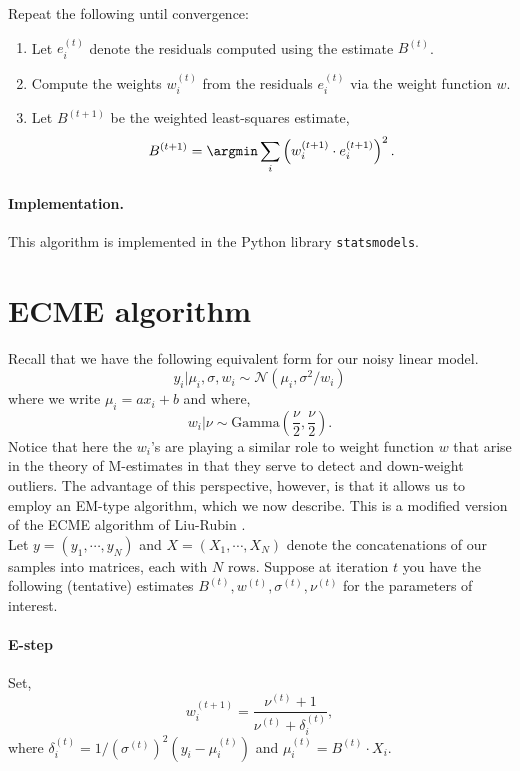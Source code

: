 \documentclass[11pt, a4 paper]{article}
\begin{document}
Repeat the following until convergence:
\begin{enumerate}

\item Let $e_i^{(t)}$ denote the residuals computed using the estimate $B^{(t)}$.

\item Compute the weights $w_i^{(t)}$ from the residuals $e_i^{(t)}$ via the weight function $w$.

\item Let $B^{(t+1)}$ be the weighted least-squares estimate,
\[
B^{(t+1)} = \argmin \sum_i \left(w_i^{(t+1)} \cdot e_i^{(t+1)}\right)^2.
\]
\end{enumerate}

\paragraph{Implementation.} This algorithm is implemented in the Python library \texttt{statsmodels}.

\section{ECME algorithm} \label{SecECME}
Recall that we have the following equivalent form for our noisy linear model.
\[
y_i | \mu_i, \sigma, w_i \sim \mathcal{N}\left(\mu_i, \sigma^2/w_i\right)
\]
where we write $\mu_i = ax_i + b$ and where,
\[
w_i | \nu \sim \mbox{Gamma}\left(\frac{\nu}{2}, \frac{\nu}{2}\right).
\]
Notice that here the $w_i$'s are playing a similar role to weight function $w$ that arise in the theory of M-estimates in that they serve to detect and down-weight outliers. The advantage of this perspective, however, is that it allows us to employ an EM-type algorithm, which we now describe. This is a modified version of the ECME algorithm of Liu-Rubin \cite{LiuRubin}.\\

Let $y = (y_1, \cdots, y_N)$ and $X = (X_1, \cdots, X_N)$ denote the concatenations of our samples into matrices, each with $N$ rows. Suppose at iteration $t$ you have the following (tentative) estimates $B^{(t)}, w^{(t)}, \sigma^{(t)}, \nu^{(t)}$ for the parameters of interest.

\paragraph{E-step} Set,
\[
w_i^{(t+1)} = \frac{\nu^{(t)} + 1}{\nu^{(t)} + \delta_i^{(t)}},
\]
where $\delta_i^{(t)} = 1/(\sigma^{(t)})^2(y_i - \mu_i^{(t)})$ and $\mu_i^{(t)} = B^{(t)}\cdot X_i$.
\end{document}

